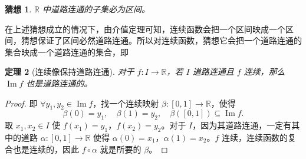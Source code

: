 \documentclass[UTF8,11pt]{ctexart}
\theoremstyle{cnthm}
\newtheorem{thm}{定理}[section]
\newtheorem{conj}[thm]{猜想}
\begin{document}
\begin{conj}
$\mathbb{R}$ 中道路连通的子集必为区间。
\end{conj}

在上述猜想成立的情况下，由介值定理可知，连续函数会把一个区间映成一个区间，猜想保证了区间必然道路连通。所以对连续函数，猜想它会把一个道路连通的集合映成一个道路连通的集合，即

\begin{thm}[连续像保持道路连通]
对于 $f:I\to\mathbb{R}$，若 $I$ 道路连通且 $f$ 连续，那么 $\operatorname{Im}f$ 也是道路连通的。
\end{thm}

\begin{proof}
即 $\forall y_1,y_2\in\operatorname{Im}f$，找一个连续映射 $\beta:[0,1]\to\mathbb{R}$，使得
\[
\beta(0)=y_1,\quad \beta(1)=y_2,\quad \beta([0,1])\subseteq\operatorname{Im}f.
\]
取 $x_1,x_2\in I$ 使 $f(x_1)=y_1$，$f(x_2)=y_2$。对于 $I$，因为其道路连通，一定有其中的道路 $\alpha:[0,1]\to\mathbb{R}$ 使得 $\alpha(0)=x_1$，$\alpha(1)=x_2$。$f$ 连续，连续函数的复合也是连续的，因此 $f\circ\alpha$ 就是所要的 $\beta$。
\end{proof}
\end{document}
